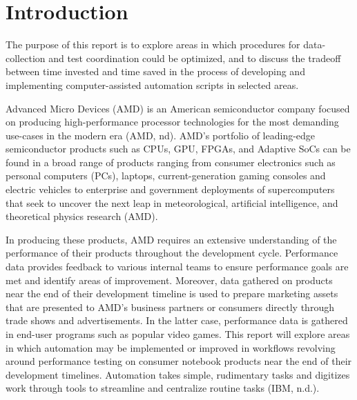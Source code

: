 \documentclass[12pt]{article}
\begin{document}

\formattingForRestOfReport
\section{Introduction}





\indent\hspace{0.5in} The purpose of this report is to explore areas in which procedures for data-collection and test coordination could be optimized, and to discuss the tradeoff between time invested and time saved in the process of developing and implementing computer-assisted automation scripts in selected areas.  

\indent\hspace{0.5in} Advanced Micro Devices (AMD) is an American semiconductor company focused on producing high-performance processor technologies for the most demanding use-cases in the modern era (AMD, nd). AMD’s portfolio of leading-edge semiconductor products such as CPUs, GPU, FPGAs, and Adaptive SoCs can be found in a broad range of products ranging from consumer electronics such as personal computers (PCs), laptops, current-generation gaming consoles and electric vehicles to enterprise and government deployments of supercomputers that seek to uncover the next leap in meteorological, artificial intelligence, and theoretical physics research (AMD). 

\indent\hspace{0.5in} In producing these products, AMD requires an extensive understanding of the performance of their products throughout the development cycle. Performance data provides feedback to various internal teams to ensure performance goals are met and identify areas of improvement. Moreover, data gathered on products near the end of their development timeline is used to prepare marketing assets that are presented to AMD’s business partners or consumers directly through trade shows and advertisements. In the latter case, performance data is gathered in end-user programs such as popular video games. 
This report will explore areas in which automation may be implemented or improved in workflows revolving around performance testing on consumer notebook products near the end of their development timelines. Automation takes simple, rudimentary tasks and digitizes work through tools to streamline and centralize routine tasks (IBM, n.d.).
\end{document}
